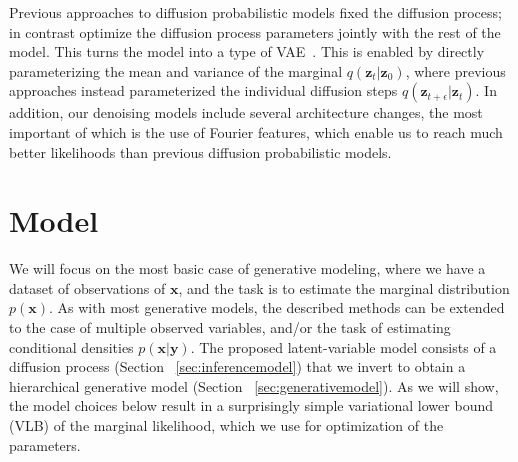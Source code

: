 \documentclass{article}
\def\rvx{{\mathbf{x}}}
\def\rvy{{\mathbf{y}}}
\def\rvz{{\mathbf{z}}}
\begin{document}
Previous approaches to diffusion probabilistic models fixed the diffusion process; in contrast optimize the diffusion process parameters jointly with the rest of the model. This turns the model into a type of VAE~\citep{kingma2013auto,rezende2014stochastic}. This is enabled by directly parameterizing the mean and variance of the marginal $q(\rvz_t|\rvz_0)$, where previous approaches instead parameterized the individual diffusion steps $q(\rvz_{t+\epsilon}|\rvz_t)$. In addition, our denoising models include several architecture changes, the most important of which is the use of Fourier features, which enable us to reach much better likelihoods than previous diffusion probabilistic models.








\section{Model}
\label{sec:model}
We will focus on the most basic case of generative modeling, where we have a dataset of observations of $\rvx$, and the task is to estimate the marginal distribution $p(\rvx)$. As with most generative models, the described methods can be extended to the case of multiple observed variables, and/or the task of estimating conditional densities $p(\rvx|\rvy)$. The proposed latent-variable model consists of a diffusion process (Section ~\ref{sec:inferencemodel}) that we invert to obtain a hierarchical generative model (Section ~\ref{sec:generativemodel}). As we will show, the model choices below result in a surprisingly simple variational lower bound (VLB) of the marginal likelihood, which we use for optimization of the parameters.
\end{document}
